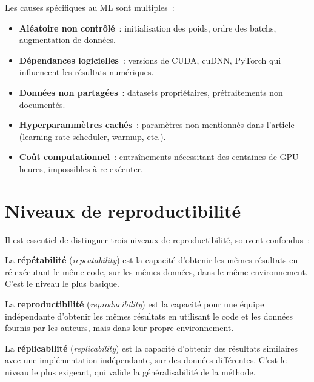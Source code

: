 Les causes sp\'ecifiques au ML sont multiples~:

\begin{itemize}
  \item \textbf{Al\'eatoire non contr\^ol\'e}~: initialisation des poids,
    ordre des batchs, augmentation de donn\'ees.
  \item \textbf{D\'ependances logicielles}~: versions de CUDA, cuDNN, PyTorch
    qui influencent les r\'esultats num\'eriques.
  \item \textbf{Donn\'ees non partag\'ees}~: datasets propri\'etaires,
    pr\'etraitements non document\'es.
  \item \textbf{Hyperparamm\`etres cach\'es}~: param\`etres non mentionn\'es
    dans l'article (learning rate scheduler, warmup, etc.).
  \item \textbf{Co\^ut computationnel}~: entra\^inements n\'ecessitant des
    centaines de GPU-heures, impossibles \`a re-ex\'ecuter.
\end{itemize}

\section{Niveaux de reproductibilit\'e}
\label{sec:niveaux-repro}

Il est essentiel de distinguer trois niveaux de reproductibilit\'e, souvent
confondus~:

\begin{definition}[R\'ep\'etabilit\'e]
La \textbf{r\'ep\'etabilit\'e} (\emph{repeatability})
est la capacit\'e d'obtenir les m\^emes r\'esultats en r\'e-ex\'ecutant le
m\^eme code, sur les m\^emes donn\'ees, dans le m\^eme environnement.
C'est le niveau le plus basique.
\end{definition}

\begin{definition}[Reproductibilit\'e]
La \textbf{reproductibilit\'e}
(\emph{reproducibility}) est la capacit\'e pour une \'equipe ind\'ependante
d'obtenir les m\^emes r\'esultats en utilisant le code et les donn\'ees
fournis par les auteurs, mais dans leur propre environnement.
\end{definition}

\begin{definition}[R\'eplicabilit\'e]
La \textbf{r\'eplicabilit\'e} (\emph{replicability})
est la capacit\'e d'obtenir des r\'esultats similaires avec une
impl\'ementation ind\'ependante, sur des donn\'ees diff\'erentes. C'est le
niveau le plus exigeant, qui valide la g\'en\'eralisabilit\'e de la m\'ethode.
\end{definition}

